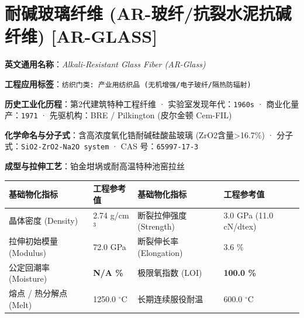 \documentclass[11pt,openright,twoside,UTF8]{ctexbook}
\begin{document}
\section{耐碱玻璃纤维 (AR-玻纤/抗裂水泥抗碱纤维) [AR-GLASS]}
\label{sec:ar-glass}

\noindent\textbf{英文通用名称}：\textit{Alkali-Resistant Glass Fiber (AR-Glass)}\par
\noindent\textbf{工程应用标签}：\texttt{纺织门类: 产业用纺织品 (无机增强/电子玻纤/隔热防辐射)}\par
\noindent\textbf{历史工业化历程}：第2代建筑特种工程纤维 · 实验室发现年代：\texttt{1960s} · 商业化量产：\texttt{1971} · 先驱机构：BRE / Pilkington (皮尔金顿 Cem-FIL)\par
\noindent\textbf{化学命名与分子式}：含高浓度氧化锆耐碱硅酸盐玻璃 (ZrO2含量\textgreater{}16.7\%) · 分子式：\texttt{SiO2-ZrO2-Na2O system} · CAS 号：\texttt{65997-17-3}\par
\noindent\textbf{成型与拉伸工艺}：铂金坩埚或耐高温特种池窑拉丝\par

\vspace{0.15cm}
\begin{center}
\small
\begin{tabularx}{\textwidth}{p{3.8cm}Xp{3.8cm}X}
\toprule
\textbf{基础物化指标} & \textbf{工程参考值} & \textbf{基础物化指标} & \textbf{工程参考值} \\
\midrule
晶体密度 (Density) & 2.74 g/cm$^3$ & 断裂拉伸强度 (Strength) & 3.0 GPa (11.0 cN/dtex) \\
拉伸初始模量 (Modulus) & 72.0 GPa & 断裂伸长率 (Elongation) & 3.6 \% \\
公定回潮率 (Moisture) & \textbf{N/A \%} & 极限氧指数 (LOI) & \textbf{100.0 \%} \\
熔点 / 热分解点 (Melt) & 1250.0 $^\circ\mathrm{C}$ & 长期连续服役耐温 & 600.0 $^\circ\mathrm{C}$ \\
\bottomrule
\end{tabularx}
\end{center}
\vspace{0.15cm}
\end{document}
